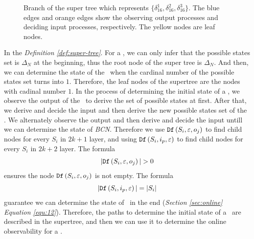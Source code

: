   \begin{figure}[thpb]
      \centering
      
      \caption{Branch of the super tree which represents $\{\delta_{16}^1,\delta_{16}^2,\delta_{16}^3\}$. The blue edges and orange edges show the observing output processes and deciding input processes, respectively. The yellow nodes are leaf nodes.}
      \label{fig:3}
   \end{figure}

In the {\em Definition \ref{def:super-tree}}. For a \BCN, we can only infer that the possible states set is $\Delta_N$ at the beginning, thus the root node of the super tree is $\Delta_N$. And then,  we can determine the state of the \BCN\ when the cardinal number of the possible states set turns into $1$. Therefore, the leaf nodes of the supertree are the nodes with cadinal number $1$. In the process of determining the initial state of a \BCN, we observe the output of the \BCN\ to derive the set of possible states at first. After that, we derive and decide the input and then derive the new possible states set of the \BCN. We alternately observe the output and then derive and decide the input untill we can determine the state of {\em BCN}. Therefore we use ${\tt Df}\left(S_i,\varepsilon, o_j\right)$ to find child nodes for every $S_i$ in $2k+1$ layer, and using ${\tt Df}\left(S_i,i_p,\varepsilon\right)$ to find child nodes for every $S_i$ in $2k+2$ layer. The formula 
\[|\Ded\left(S_i,\varepsilon, o_j\right)|>0\]
 ensures the node ${\tt Df}\left(S_i,\varepsilon, o_j\right)$ is not empty. The formula 
 \[|{\tt Df}\left(S_i,i_p,\varepsilon\right)|=|S_i|\] 
 guarantee we can determine the state of \BCN\ in the end ({\em Section \ref{sec:online}} {\em Equation \ref{equ:12}}). Therefore, the paths to determine the initial state of a \BCN\ are described in the supertree, and then we can use it to determine the online observability for a \BCN.

